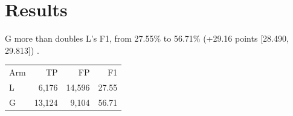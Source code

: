 \section{Results}
G more than doubles L's F1, from 27.55\% to 56.71\% (+29.16 points {[}28.490, 29.813{]}) \cite{r4}.
\begin{tabular}{lrrr}
Arm & TP & FP & F1 \\
L & 6,176 & 14,596 & 27.55 \\
G & 13,124 & 9,104 & 56.71 \\
\end{tabular}

